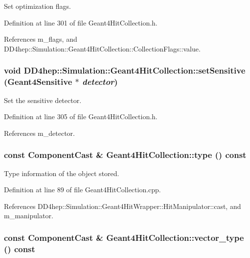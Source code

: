 Set optimization flags. 

Definition at line 301 of file Geant4HitCollection.h.

References m\_\-flags, and DD4hep::Simulation::Geant4HitCollection::CollectionFlags::value.\hypertarget{class_d_d4hep_1_1_simulation_1_1_geant4_hit_collection_a5d4547aa0f97d5ef2391986f634806d5}{
\subsubsection[{setSensitive}]{\setlength{\rightskip}{0pt plus 5cm}void DD4hep::Simulation::Geant4HitCollection::setSensitive ({\bf Geant4Sensitive} $\ast$ {\em detector})}}
\label{class_d_d4hep_1_1_simulation_1_1_geant4_hit_collection_a5d4547aa0f97d5ef2391986f634806d5}


Set the sensitive detector. 

Definition at line 305 of file Geant4HitCollection.h.

References m\_\-detector.\hypertarget{class_d_d4hep_1_1_simulation_1_1_geant4_hit_collection_a263640a2e743c7c59bc497c456fe735a}{
\subsubsection[{type}]{\setlength{\rightskip}{0pt plus 5cm}const {\bf ComponentCast} \& Geant4HitCollection::type () const}}
\label{class_d_d4hep_1_1_simulation_1_1_geant4_hit_collection_a263640a2e743c7c59bc497c456fe735a}


Type information of the object stored. 

Definition at line 89 of file Geant4HitCollection.cpp.

References DD4hep::Simulation::Geant4HitWrapper::HitManipulator::cast, and m\_\-manipulator.\hypertarget{class_d_d4hep_1_1_simulation_1_1_geant4_hit_collection_a59732e13080bb3b440b3f6674743d80a}{
\subsubsection[{vector\_\-type}]{\setlength{\rightskip}{0pt plus 5cm}const {\bf ComponentCast} \& Geant4HitCollection::vector\_\-type () const}}
\label{class_d_d4hep_1_1_simulation_1_1_geant4_hit_collection_a59732e13080bb3b440b3f6674743d80a}


